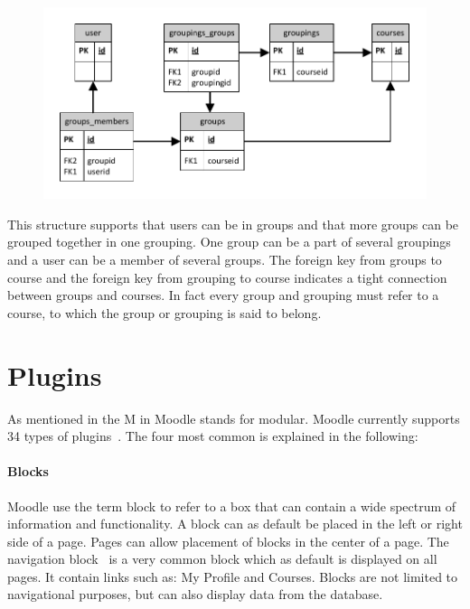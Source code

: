 \begin{figure}
	\centering
		\includegraphics[width=\textwidth]{images/moodlegroups}
	\label{fig:moodlegroupsandgroupings}
\end{figure}

This structure supports that users can be in groups and that more groups can be grouped together in one grouping. 
One group can be a part of several groupings and a user can be a member of several groups. 
The foreign key from groups to course and the foreign key from grouping to course indicates a tight connection between groups and courses.
In fact every group and grouping must refer to a course, to which the group or grouping is said to belong.

\section{Plugins}
\label{sub:plugins}
As mentioned in  the M in Moodle stands for modular. 
Moodle currently supports 34 types of plugins~\cite{plugin}.
The four most common is explained in the following:




\paragraph{Blocks}
\label{subsec:blocks}
Moodle use the term block to refer to a box that can contain a wide spectrum of information and functionality.
A block can as default be placed in the left or right side of a page. 
Pages can allow placement of blocks in the center of a page.
The navigation block~\cite{navigationblock} is a very common block which as default is displayed on all pages. 
It contain links such as: My Profile and Courses. 
Blocks are not limited to navigational purposes, but can also display data from the database.

